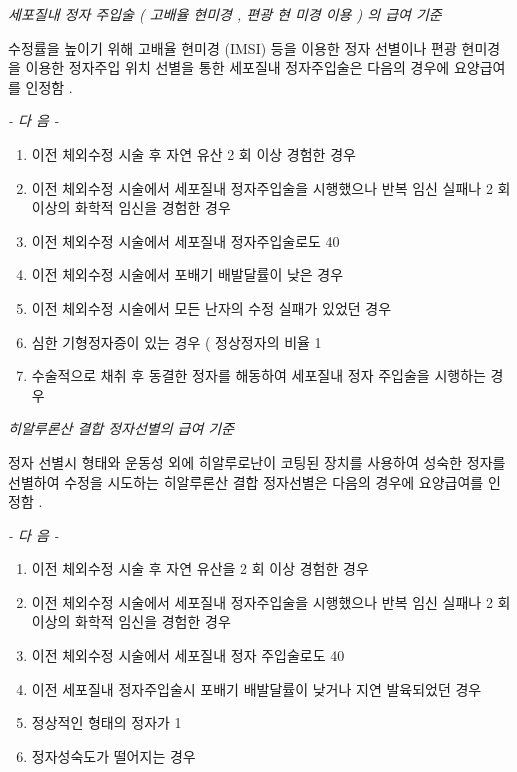 \emph{세포질내 정자 주입술 ( 고배율 현미경 ,  편광 현 미경 이용 ) 의  급여 기준 }\par
수정률을 높이기 위해 고배율 현미경 (IMSI)  등을 이용한 정자  선별이나 편광 현미경을 이용한 정자주입 위치 선별을 통한 세포질내 정자주입술은 다음의 경우에 요양급여를 인정함 . \par

\emph{-  다 음  -}\par 
\begin{enumerate}[가.]\tightlist
\item 이전 체외수정 시술 후 자연 유산  2 회 이상 경험한 경우 
\item 이전 체외수정 시술에서 세포질내 정자주입술을 시행했으나  반복 임신 실패나  2 회 이상의 화학적 임신을 경험한 경우 
\item 이전 체외수정 시술에서 세포질내 정자주입술로도  40%
\item 이전 체외수정 시술에서 포배기 배발달률이 낮은 경우 
\item 이전 체외수정 시술에서 모든 난자의 수정 실패가 있었던 경우 
\item 심한 기형정자증이 있는 경우 ( 정상정자의 비율  1%
\item 수술적으로 채취 후 동결한 정자를 해동하여 세포질내 정자 주입술을 시행하는 경우 
\end{enumerate} 

\emph{히알루론산 결합  정자선별의 급여 기준 }\par
정자 선별시 형태와 운동성 외에 히알루로난이 코팅된 장치를  사용하여 성숙한 정자를 선별하여 수정을 시도하는 히알루론산  결합 정자선별은 다음의 경우에 요양급여를 인정함 . \par

\emph{-  다 음  -}\par  
\begin{enumerate}[가.]\tightlist
\item 이전 체외수정 시술 후 자연 유산을  2 회 이상 경험한 경우 
\item 이전 체외수정 시술에서 세포질내 정자주입술을 시행했으나  반복 임신 실패나  2 회 이상의 화학적 임신을 경험한 경우  
\item 이전 체외수정 시술에서 세포질내 정자 주입술로도  40%
\item 이전  세포질내 정자주입술시  포배기 배발달률이 낮거나 지연 발육되었던 경우 
\item 정상적인 형태의 정자가  1%
\item 정자성숙도가 떨어지는 경우 
\end{enumerate} 

